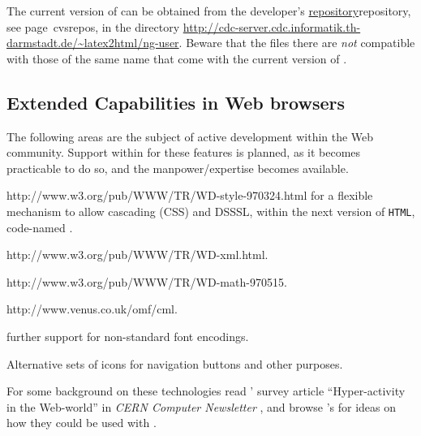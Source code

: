 \medskip\noindent
The current version of \latextohtmlNG{} can be obtained from
the developer's \hyperref[page]{repository}{repository, see page~}{}{cvsrepos},
in the directory
\url{http://cdc-server.cdc.informatik.th-darmstadt.de/~latex2html/ng-user}.
Beware that the files there are \emph{not} compatible with those of the
same name that come with the current version of \latextohtml.



\subsection*{Extended Capabilities in Web browsers}
The following areas are the subject of active development
within the Web community.
Support within \latextohtml{} for these features is planned,
as it becomes practicable to do so, and the manpower/expertise
becomes available.
\begin{description}
%
%
%
\item [style-sheets: ] %
{http://www.w3.org/pub/WWW/TR/WD-style-970324.html}
for a flexible mechanism to allow cascading (CSS) and DSSSL,
within the next version of \texttt{HTML}, code-named
.
%
%
%
\item [XML: ] %
{http://www.w3.org/pub/WWW/TR/WD-xml.html}.

%
%
\item [MathML: ] %
{http://www.w3.org/pub/WWW/TR/WD-math-970515}.

%
%
\item [CML: ] %
{http://www.venus.co.uk/omf/cml}.

%
\item [Fonts: ] further support for non-standard font encodings.

%
\item [Icons: ] Alternative sets of icons for navigation buttons
and other purposes.
\end{description}
For some background on these technologies read
\Goossens' survey article ``Hyper-activity in the Web-world''
in \textsl{CERN Computer Newsletter}
,
and browse \AxelRamge's
for ideas on how they could be used with \latextohtml.



\endinput












